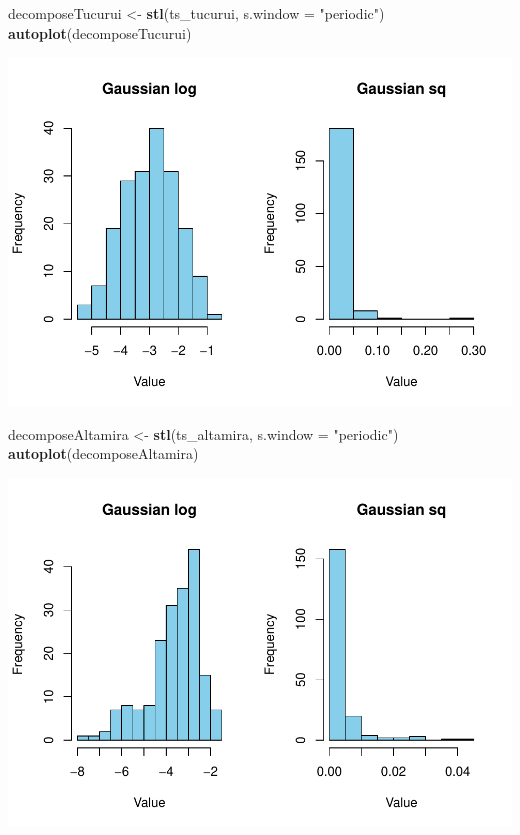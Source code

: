 \documentclass[
]{article}
\newenvironment{Shaded}{\begin{snugshade}}{\end{snugshade}}
\newcommand{\AttributeTok}[1]{\textcolor[rgb]{0.13,0.29,0.53}{#1}}
\newcommand{\FunctionTok}[1]{\textcolor[rgb]{0.13,0.29,0.53}{\textbf{#1}}}
\newcommand{\NormalTok}[1]{#1}
\newcommand{\OtherTok}[1]{\textcolor[rgb]{0.56,0.35,0.01}{#1}}
\newcommand{\StringTok}[1]{\textcolor[rgb]{0.31,0.60,0.02}{#1}}
\begin{document}
\begin{Shaded}
\begin{Highlighting}[]
\NormalTok{decomposeTucurui }\OtherTok{\textless{}{-}} \FunctionTok{stl}\NormalTok{(ts\_tucurui, }\AttributeTok{s.window =} \StringTok{"periodic"}\NormalTok{)}
\FunctionTok{autoplot}\NormalTok{(decomposeTucurui)}
\end{Highlighting}
\end{Shaded}

\includegraphics{ts_construction_labor_files/figure-latex/unnamed-chunk-13-1.pdf}

\begin{Shaded}
\begin{Highlighting}[]
\NormalTok{decomposeAltamira }\OtherTok{\textless{}{-}} \FunctionTok{stl}\NormalTok{(ts\_altamira, }\AttributeTok{s.window =} \StringTok{"periodic"}\NormalTok{)}
\FunctionTok{autoplot}\NormalTok{(decomposeAltamira)}
\end{Highlighting}
\end{Shaded}

\includegraphics{ts_construction_labor_files/figure-latex/unnamed-chunk-14-1.pdf}
\end{document}
